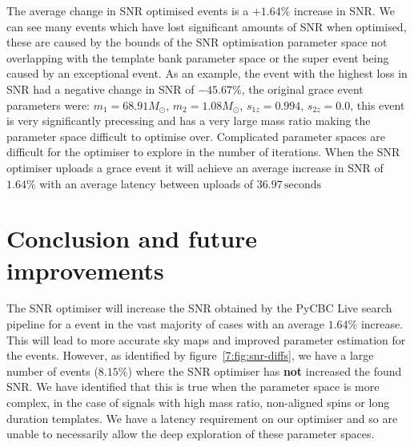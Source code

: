 %
The average change in SNR optimised events is a $+1.64\%$ increase in SNR. We can see many events which have lost significant amounts of SNR when optimised, these are caused by the bounds of the SNR optimisation parameter space not overlapping with the template bank parameter space or the super event being caused by an exceptional event. As an example, the event with the highest loss in SNR had a negative change in SNR of $-45.67\%$, the original grace event parameters were: $m_{1} = 68.91 M_{\odot}$, $m_{2} = 1.08 M_{\odot}$, $s_{1z} = 0.994$, $s_{2z} = 0.0$, this event is very significantly precessing and has a very large mass ratio making the parameter space difficult to optimise over. Complicated parameter spaces are difficult for the optimiser to explore in the number of iterations. When the SNR optimiser uploads a grace event it will achieve an average increase in SNR of $1.64\%$ with an average latency between uploads of $36.97 \, \text{seconds}$

\section{\label{7:sec:conclusion}Conclusion and future improvements}

The SNR optimiser will increase the SNR obtained by the PyCBC Live search pipeline for a \gwadj event in the vast majority of cases with an average $1.64\%$ increase. This will lead to more accurate sky maps and improved parameter estimation for the \gwadj events. However, as identified by figure~\ref{7:fig:snr-diffs}, we have a large number of events ($8.15\%$) where the SNR optimiser has \textbf{not} increased the found SNR. We have identified that this is true when the parameter space is more complex, in the case of signals with high mass ratio, non-aligned spins or long duration templates. We have a latency requirement on our optimiser and so are unable to necessarily allow the deep exploration of these parameter spaces.


